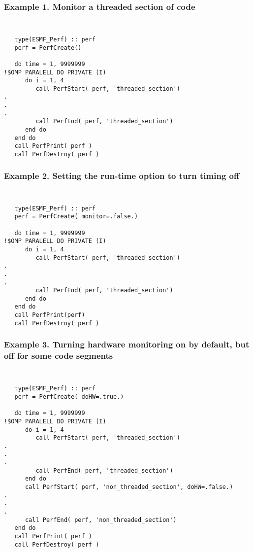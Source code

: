%



\subsubsection{Example 1. Monitor a threaded section of code}
{\tt
\begin{verbatim}
   type(ESMF_Perf) :: perf
   perf = PerfCreate()

   do time = 1, 9999999
!$OMP PARALELL DO PRIVATE (I)
      do i = 1, 4
         call PerfStart( perf, 'threaded_section')
.
.
.
         call PerfEnd( perf, 'threaded_section')
      end do
   end do
   call PerfPrint( perf )
   call PerfDestroy( perf )
\end{verbatim}
}
\subsubsection{Example 2. Setting the run-time option to turn timing off}
{\tt
\begin{verbatim}
   type(ESMF_Perf) :: perf
   perf = PerfCreate( monitor=.false.)

   do time = 1, 9999999
!$OMP PARALELL DO PRIVATE (I)
      do i = 1, 4
         call PerfStart( perf, 'threaded_section')
.
.
.
         call PerfEnd( perf, 'threaded_section')
      end do
   end do
   call PerfPrint(perf)
   call PerfDestroy( perf )
\end{verbatim}
}
\subsubsection{Example 3. Turning hardware monitoring on by default, but off 
for some code segments}
{\tt
\begin{verbatim}
   type(ESMF_Perf) :: perf
   perf = PerfCreate( doHW=.true.)

   do time = 1, 9999999
!$OMP PARALELL DO PRIVATE (I)
      do i = 1, 4
         call PerfStart( perf, 'threaded_section')
.
.
.
         call PerfEnd( perf, 'threaded_section')
      end do
      call PerfStart( perf, 'non_threaded_section', doHW=.false.)
.
.
.
      call PerfEnd( perf, 'non_threaded_section')
   end do
   call PerfPrint( perf )
   call PerfDestroy( perf )
\end{verbatim}
}

